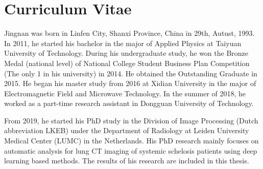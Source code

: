 \chapter{Curriculum Vitae}

Jingnan was born in Linfen City, Shanxi Province, China in 29th, Autust, 1993. In 2011, he started his bachelor in the major of Applied Physics at Taiyuan University of Technology. During his undergraduate study, he won the Bronze Medal (national level) of National College Student Business Plan Competition (The only 1
in his university) in 2014. He obtained the Outstanding Graduate in 2015. He began his master study from 2016 at Xidian University in the major of Electromagnetic Field and Microwave Technology. In the summer of 2018, he worked as a part-time research assistant in Dongguan University of Technology.

From 2019, he started his PhD study in the Division of Image Processing (Dutch abbreviation LKEB) under the Department of Radiology at Leiden University Medical Center (LUMC) in the Netherlands. His PhD research mainly focuses on automatic analysis for lung CT imaging of systemic schelosis patients using deep learning based methods. The results of his research are included in this thesis.

